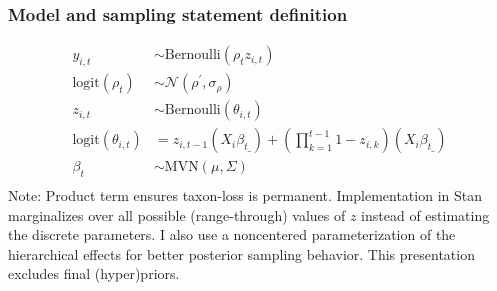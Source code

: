 \documentclass{beamer}
\begin{document}
\begin{frame}
  \frametitle{Model and sampling statement definition}
  \footnotesize{
    \begin{align*}
      y_{i,t} &\sim \text{Bernoulli}(\rho_{t} z_{i,t}) \\
      \text{logit}(\rho_{t}) &\sim \mathcal{N}(\rho^{'}, \sigma_{\rho}) \\
      z_{i,t} &\sim \text{Bernoulli}(\theta_{i, t}) \\
      \text{logit}(\theta_{i, t}) &= z_{i,t-1} (X_{i} \beta_{t\_}) + (\prod_{k = 1}^{t-1} 1 - z_{i,k}) (X_{i} \beta_{t\_}) \\
      \beta_{t} &\sim \text{MVN}(\mu, \Sigma) \\
    \end{align*}
  }
  \scriptsize{Note: Product term ensures taxon-loss is permanent. Implementation in Stan marginalizes over all possible (range-through) values of \(z\) instead of estimating the discrete parameters. I also use a noncentered parameterization of the hierarchical effects for better posterior sampling behavior. This presentation excludes final (hyper)priors.}
\end{frame}
\end{document}
